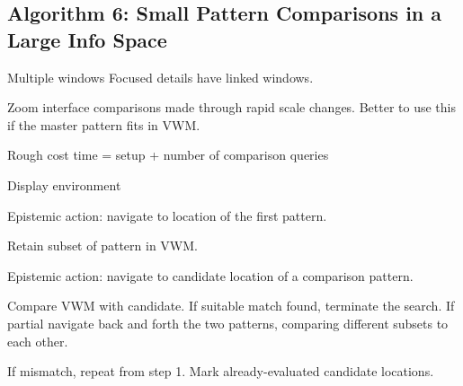 \begin{mdframed}
\begin{multicols}{2}
\subsection{Algorithm 6: Small Pattern Comparisons in a Large Info Space}
\begin{compactdesc}
\item[Multiple windows] Focused details have linked windows.
\item[Zoom interface] comparisons made through rapid scale changes. Better to
    use this if the master pattern fits in VWM.
\item[Rough cost] time = setup + number of comparison queries
\item[Display environment]
\end{compactdesc}

\midrule\begin{compactenum}
\item Epistemic action: navigate to location of the first pattern.
\item Retain subset of pattern in VWM.
\item Epistemic action: navigate to candidate location of a comparison pattern.
\item Compare VWM with candidate. If suitable match found, terminate the
    search. If partial navigate back and forth the two patterns, comparing
    different subsets to each other.
\item If mismatch, repeat from step 1. Mark already-evaluated candidate
    locations.
\end{compactenum}

\end{multicols}\end{mdframed}





